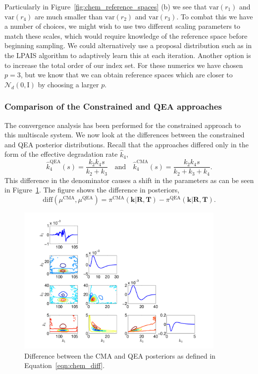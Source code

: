 \documentclass[final]{siamltex}
\begin{document}
Particularly in Figure~\ref{fig:chem_reference_spaces} (b) we see that $\text{var}(r_1)$ and $\text{var}(r_4)$ are much smaller than $\text{var}(r_2)$ and $\text{var}(r_3)$. To combat this we have a number of choices, we might wish to use two different scaling parameters to match these scales, which would require knowledge of the reference space before beginning sampling. We could alternatively use a proposal distribution such as in the LPAIS algorithm to adaptively learn this at each iteration. Another option is to increase the total order of our index set. For these numerics we have chosen $p=3$, but we know that we can obtain reference spaces which are closer to $\mathcal{N}_d(0, \text{I})$ by choosing a larger $p$.

\subsubsection{Comparison of the Constrained and QEA approaches}

The convergence analysis has been performed for the constrained approach to this multiscale system. We now look at the differences between the constrained and QEA posterior distributions. Recall that the approaches differed only in the form of the effective degradation rate $\hat{k}_4$,
\[
	\hat{k}_4^{\text{QEA}}(s) = \frac{k_2k_4s}{k_2+k_3} \quad \text{and} \quad \hat{k}_4^{\text{CMA}}(s) = \frac{k_2k_4s}{k_2+k_3+k_4}.
\]
This difference in the denominator causes a shift in the parameters as can be seen in Figure~\ref{fig:chem_diff}. The figure shows the difference in posteriors,
\begin{equation}\label{eqn:chem_diff}
	\text{diff}(\mu^{\text{CMA}}, \mu^{\text{QEA}}) = \pi^{\text{CMA}}(\mathbf{k}|\mathbf{R},\mathbf{T}) - \pi^{\text{QEA}}(\mathbf{k}|\mathbf{R},\mathbf{T}).
\end{equation}

\begin{figure}[htb]
\centering
\includegraphics[width=0.9\textwidth]{"images/Diff_CMA_QEA"}
\caption{Difference between the CMA and QEA posteriors as defined in Equation~\eqref{eqn:chem_diff}.}
\label{fig:chem_diff}
\end{figure}
\end{document}
